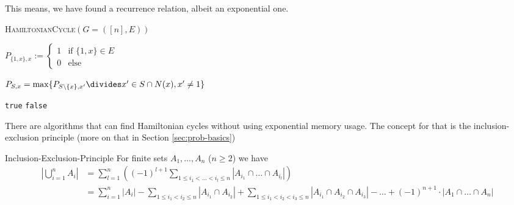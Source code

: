 This means, we have found a recurrence relation, albeit an exponential one.
\begin{algorithm}
    \caption{\textsc{HamiltonianCycle}$(G=([n], E))$}
    \begin{algorithmic}[1]
         
            \State $\displaystyle P_{\{1, x\}, x} :=
                \begin{cases}
                    1 & \text{if } \{1, x\} \in E \\
                    0 & \text{else}
                \end{cases}$
        \EndFor

         
             
                 
                    \State $P_{S, x} = \max\{P_{S\backslash \{x\}, x'} \divides x' \in S \cap N(x), x' \neq 1\}$
                \EndFor
            \EndFor
        \EndFor

         
            \State \Return \verb|true|
        \Else
            \State \Return \verb|false|
        \EndIf
    \end{algorithmic}
\end{algorithm}

\newpage
{}

There are algorithms that can find Hamiltonian cycles without using exponential memory usage.
The concept for that is the inclusion-exclusion principle (more on that in Section \ref{sec:prob-basics})

\begin{theorem}[]{Inclusion-Exclusion-Principle}
    For finite sets $A_1, \ldots, A_n$ ($n \geq 2$) we have
    \begin{align*}
        \left| \bigcup_{i = 1}^n A_i \right| & = \sum_{l = 1}^{n}\left((-1)^{l + 1} \sum_{1 \leq i_1 < \dots < i_l \leq n} |A_{i_1} \cap \ldots \cap A_{i_l}|\right)                                                                                              \\
                                             & = \sum_{i = 1}^{n}|A_i| - \sum_{1 \leq i_1 < i_2 \leq n}|A_{i_1} \cap A_{i_2}| + \sum_{1 \leq i_1 < i_2 < i_3 \leq n} |A_{i_1} \cap A_{i_2} \cap A_{i_3}| - \ldots + (-1)^{n + 1} \cdot |A_1 \cap \ldots \cap A_n|
    \end{align*}
\end{theorem}

